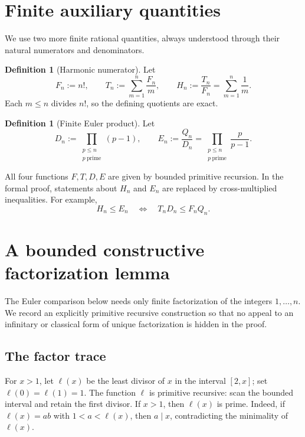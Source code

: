 \documentclass[11pt]{article}
\theoremstyle{definition}
\newtheorem{definition}[theorem]{Definition}
\newcommand{\ProdP}{Q}
\newcommand{\DenE}{D}
\newcommand{\Fact}{F}
\newcommand{\NumH}{T}
\begin{document}
\section{Finite auxiliary quantities}

We use two more finite rational quantities, always understood through their
natural numerators and denominators.

\begin{definition}[Harmonic numerator]\label{def:harmonic}
Let
\[
  \Fact_n:=n!,\qquad
  \NumH_n:=\sum_{m=1}^{n}\frac{\Fact_n}{m},\qquad
  H_n:=\frac{\NumH_n}{\Fact_n}=\sum_{m=1}^{n}\frac1m.
\]
Each \(m\leq n\) divides \(n!\), so the defining quotients are exact.
\end{definition}

\begin{definition}[Finite Euler product]\label{def:euler}
Let
\[
  \DenE_n:=\prod_{\substack{p\leq n\\p\ \mathrm{prime}}}(p-1),
  \qquad
  E_n:=\frac{\ProdP_n}{\DenE_n}
      =\prod_{\substack{p\leq n\\p\ \mathrm{prime}}}\frac{p}{p-1}.
\]
\end{definition}

All four functions \(\Fact,\NumH,\DenE,E\) are given by bounded primitive
recursion.  In the formal proof, statements about \(H_n\) and \(E_n\) are
replaced by cross-multiplied inequalities.  For example,
\[
 H_n\leq E_n
 \quad\Longleftrightarrow\quad
 \NumH_n\DenE_n\leq \Fact_n\ProdP_n.
\]

\section{A bounded constructive factorization lemma}

The Euler comparison below needs only finite factorization of the integers
\(1,\ldots,n\).  We record an explicitly primitive recursive construction so
that no appeal to an infinitary or classical form of unique factorization is
hidden in the proof.

\subsection{The factor trace}

For \(x>1\), let \(\ell(x)\) be the least divisor of \(x\) in the interval
\([2,x]\); set \(\ell(0)=\ell(1)=1\).  The function \(\ell\) is primitive
recursive: scan the bounded interval and retain the first divisor.  If
\(x>1\), then \(\ell(x)\) is prime.  Indeed, if
\(\ell(x)=ab\) with \(1<a<\ell(x)\), then \(a\mid x\), contradicting the
minimality of \(\ell(x)\).
\end{document}
